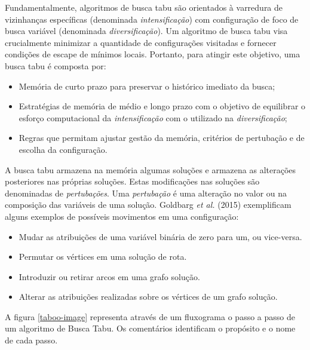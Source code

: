 Fundamentalmente, algoritmos de busca tabu são orientados à varredura de vizinhanças específicas (denominada \emph{intensificação}) com configuração de foco de busca variável (denominada \emph{diversificação}). Um algoritmo de busca tabu visa crucialmente minimizar a quantidade de configurações visitadas e fornecer condições de escape de mínimos locais. Portanto, para atingir este objetivo, uma busca tabu é composta por:

\begin{itemize}
    \item Memória de curto prazo para preservar o histórico imediato da busca;
    \item Estratégias de memória de médio e longo prazo com o objetivo de equilibrar o esforço computacional da \emph{intensificação} com o utilizado na \emph{diversificação};
    \item Regras que permitam ajustar gestão da memória, critérios de pertubação e de escolha da configuração.
\end{itemize}

A busca tabu armazena na memória algumas soluções e armazena as alterações posteriores nas próprias soluções. Estas modificações nas soluções são denominadas de \emph{pertubações}. Uma \emph{pertubação} é uma alteração no valor ou na composição das variáveis de uma solução. Goldbarg \emph{et al.} (2015) exemplificam alguns exemplos de possíveis movimentos em uma configuração:

\begin{itemize}
    \item Mudar as atribuições de uma variável binária de zero para um, ou vice-versa.
    \item Permutar os vértices em uma solução de rota.
    \item Introduzir ou retirar arcos em uma grafo solução.
    \item Alterar as atribuições realizadas sobre os vértices de um grafo solução.
\end{itemize}

A figura \ref{taboo-image} representa através de um fluxograma o passo a passo de um algoritmo de Busca Tabu. Os comentários identificam o propósito e o nome de cada passo. 


